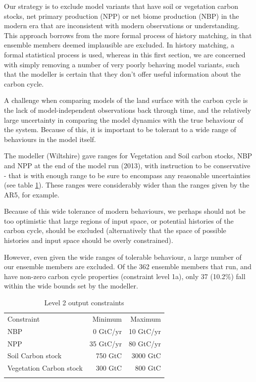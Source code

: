 \documentclass[gmd, manuscript]{copernicus}
\begin{document}
Our strategy is to exclude model variants that have soil or vegetation carbon stocks, net primary production (NPP) or net biome production (NBP) in the modern era that are inconsistent with modern observations or understanding. This approach borrows from the more formal process of history matching, in that ensemble members deemed implausible are excluded. In history matching, a formal statistical process is used, whereas in this first section, we are concerned with simply removing a number of very poorly behaving model variants, such that the modeller is certain that they don't offer useful information about the carbon cycle.

A challenge when comparing models of the land surface with the carbon cycle is the lack of model-independent observations back through time, and the relatively large uncertainty in comparing the model dynamics with the true behaviour of the system. Because of this, it is important to be tolerant to a wide range of behaviours in the model itself. 

The modeller (Wiltshire) gave ranges for Vegetation and Soil carbon stocks, NBP and NPP at the end of the model run (2013), with instruction to be conservative - that is with enough range to be sure to encompass any reasonable uncertainties (see table \ref{table:level_2_constraints}). These ranges were considerably wider than the ranges given by the AR5, for example.

Because of this wide tolerance of modern behaviours, we perhaps should not be too optimistic that large regions of input space, or potential histories of the carbon cycle, should be excluded (alternatively that the space of possible histories and input space should be overly constrained).

However, even given the wide ranges of tolerable behaviour, a large number of our ensemble members are excluded. Of the 362 ensemble members that run, and have non-zero carbon cycle properties (constraint level 1a), only 37 (10.2\%) fall within the wide bounds set by the modeller.






\begin{table}[t]
\caption{Level 2 output constraints}
\label{table:level_2_constraints}
\begin{tabular}{l r r}
\tophline
Constraint & Minimum & Maximum \\ 
\middlehline
NBP & 0 GtC/yr &  10 GtC/yr\\
NPP & 35 GtC/yr & 80 GtC/yr \\
Soil Carbon stock & 750 GtC &  3000 GtC\\ 
Vegetation Carbon stock & 300 GtC & 800 GtC \\

\bottomhline
\end{tabular}
\belowtable{} %

\end{table}
\end{document}
